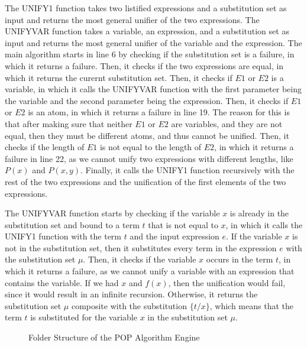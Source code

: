 The UNIFY1 function takes two listified expressions and a substitution set as input and returns the most general unifier of the two expressions. The UNIFYVAR function takes a variable, an expression, and a substitution set as input and returns the most general unifier of the variable and the expression. The main algorithm starts in line 6 by checking if the substitution set is a failure, in which it returns a failure. Then, it checks if the two expressions are equal, in which it returns the curernt substitution set. Then, it checks if $E1$ or $E2$ is a variable, in which it calls the UNIFYVAR function with the first parameter being the variable and the second parameter being the expression. Then, it checks if $E1$ or $E2$ is an atom, in which it returns a failure in line 19. The reason for this is that after making sure that neither $E1$ or $E2$ are variables, and they are not equal, then they must be different atoms, and thus cannot be unified. Then, it checks if the length of $E1$ is not equal to the length of $E2$, in which it returns a failure in line 22, as we cannot unify two expressions with different lengths, like $P(x)$ and $P(x, y)$. Finally, it calls the UNIFY1 function recursively with the rest of the two expressions and the unification of the first elements of the two expressions.

The UNIFYVAR function starts by checking if the variable $x$ is already in the substitution set and bound to a term $t$ that is not equal to $x$, in which it calls the UNIFY1 function with the term $t$ and the input expression $e$. If the variable $x$ is not in the substitution set, then it substitutes every term in the expression $e$ with the substitution set $\mu$. Then, it checks if the variable $x$ occurs in the term $t$, in which it returns a failure, as we cannot unify a variable with an expression that contains the variable. If we had $x$ and $f(x)$, then the unification would fail, since it would result in an infinite recursion.
Otherwise, it returns the substitution set $\mu$ composite with the substitution $\{t/x\}$, which means that the term $t$ is substituted for the variable $x$ in the substitution set $\mu$.

\begin {figure}[h]
\caption{Folder Structure of the POP Algorithm Engine}
\label{fig:pop_folder_structure}
\end{figure}


